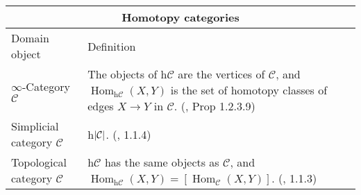 \documentclass{article}
\DeclareMathOperator{\Hom}{Hom}
\begin{document}
\begin{centre}
\begin{tabular}{ |p{5cm}||p{8cm}|}
 \hline
 \multicolumn{2}{|c|}{Homotopy categories}\\
 \hline
 Domain object & Definition\\
  \hline\hline
  \(\infty\)-Category \(\mathcal{C}\) & The objects of h\(\mathcal{C}\) are the vertices of \(\mathcal{C}\), and \(\Hom_{\text{h}\mathcal{C}}(X,Y)\) is the set of homotopy classes of edges \(X\to Y\) in \(\mathcal{C}\). (\autocite{htt}, Prop 1.2.3.9)\\
  \hline
  Simplicial category \(\mathcal{C}\) & h\(\lvert\mathcal{C}\rvert\). (\autocite{htt}, 1.1.4) \\ 
 \hline
   Topological category \(\mathcal{C}\) & h\(\mathcal{C}\) has the same objects as \(\mathcal{C}\), and \(\Hom_{\text{h}\mathcal{C}}(X,Y)=[\Hom_\mathcal{C}(X,Y)]\). (\autocite{htt}, 1.1.3) \\
  \hline 
\end{tabular}

\end{centre}

\printbibliography
\restoregeometry%
\clearpage
\end{document}
